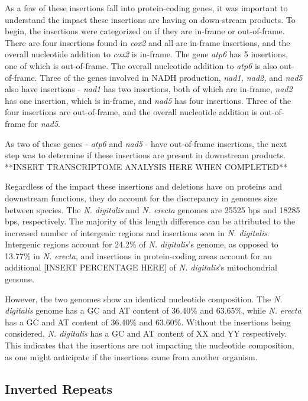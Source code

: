 \documentclass[../main.tex]{subfiles}
\begin{document}
As a few of these insertions fall into protein-coding genes, it was important to understand the impact these insertions are having on down-stream products. To begin, the insertions were categorized on if they are in-frame or out-of-frame. There are four insertions found in \emph{cox2} and all are in-frame insertions, and the overall nucleotide addition to \emph{cox2} is in-frame. The gene \emph{atp6} has 5 insertions, one of which is out-of-frame. The overall nucleotide addition to \emph{atp6} is also out-of-frame. Three of the genes involved in NADH production, \emph{nad1, nad2,} and \emph{nad5} also have insertions - \emph{nad1} has two insertions, both of which are in-frame, \emph{nad2} has one insertion, which is in-frame, and \emph{nad5} has four insertions. Three of the four insertions are out-of-frame, and the overall nucleotide addition is out-of-frame for \emph{nad5}. 

As two of these genes - \emph{atp6} and \emph{nad5} - have out-of-frame insertions, the next step was to determine if these insertions are present in downstream products. **INSERT TRANSCRIPTOME ANALYSIS HERE WHEN COMPLETED**

Regardless of the impact these insertions and deletions have on proteins and downstream functions, they do account for the discrepancy in genomes size between species. The \emph{N. digitalis} and \emph{N. erecta} genomes are 25525 bps and 18285 bps, respectively. The majority of this length difference can be attributed to the increased number of intergenic regions and insertions seen in \emph{N. digitalis}. Intergenic regions account for 24.2\% of \emph{N. digitalis}'s genome, as opposed to 13.77\% in \emph{N. erecta}, and insertions in protein-coding areas account for an additional [INSERT PERCENTAGE HERE] of \emph{N. digitalis}'s mitochondrial genome.

However, the two genomes show an identical nucleotide composition.  The \emph{N. digitalis} genome has a GC and AT content of 36.40\% and 63.65\%, while \emph{N. erecta} has a GC and AT content of 36.40\% and 63.60\%. Without the insertions being considered, \emph{N. digitalis} has a GC and AT content of XX and YY respectively. This indicates that the insertions are not impacting the nucleotide composition, as one might anticipate if the insertions came from another organism. 

\subsection{Inverted Repeats}
\end{document}
